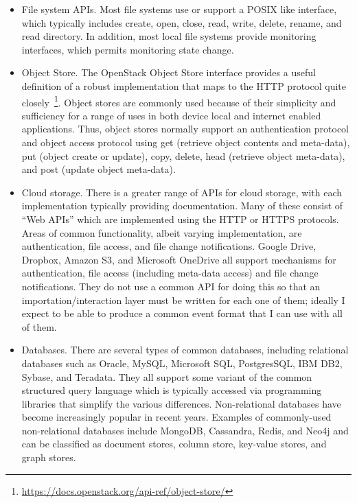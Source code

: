 \begin{itemize}
    \item File system APIs.  Most file systems use or support a POSIX like
          interface, which typically includes create, open, close, read, write, delete,
          rename, and read directory.  In addition, most local file
          systems provide monitoring interfaces, which permits monitoring
          state change.

    \item Object Store. The OpenStack Object Store interface provides a
          useful definition of a robust implementation that maps to the HTTP
          protocol quite
          closely~\footnote{\url{https://docs.openstack.org/api-ref/object-store/}}.
          Object stores are commonly used because of their simplicity and
          sufficiency for a range of uses in both device local and internet
          enabled applications. Thus, object stores normally support an
          authentication protocol and object access protocol using get
          (retrieve object contents and meta-data), put (object create or
          update), copy, delete, head (retrieve object meta-data), and
          post (update object meta-data).

    \item Cloud storage.  There is a greater range of APIs for cloud storage,
          with each implementation typically providing documentation. Many of these
          consist of ``Web APIs'' which are implemented using the HTTP or HTTPS
          protocols. Areas of common functionality, albeit varying
          implementation, are authentication, file access, and file change
          notifications. Google Drive, Dropbox, Amazon S3, and Microsoft
          OneDrive all support mechanisms for authentication, file access
          (including meta-data access) and file change notifications. They do
          not use a common API for doing this so that an
          importation/interaction layer must be written for each one of them;
          ideally I expect to be able to produce a common event format that I
          can use with all of them.

    \item Databases. There are several types of common databases,
          including relational databases such as Oracle, MySQL, Microsoft SQL,
          PostgresSQL, IBM DB2, Sybase, and Teradata. They all support some
          variant of the common structured query language which is typically
          accessed via programming libraries that simplify the various
          differences. Non-relational databases have become increasingly
          popular in recent years.  Examples of commonly-used non-relational
          databases include MongoDB, Cassandra, Redis, and Neo4j and can be
          classified as document stores, column store, key-value stores, and graph stores.


\end{itemize}
